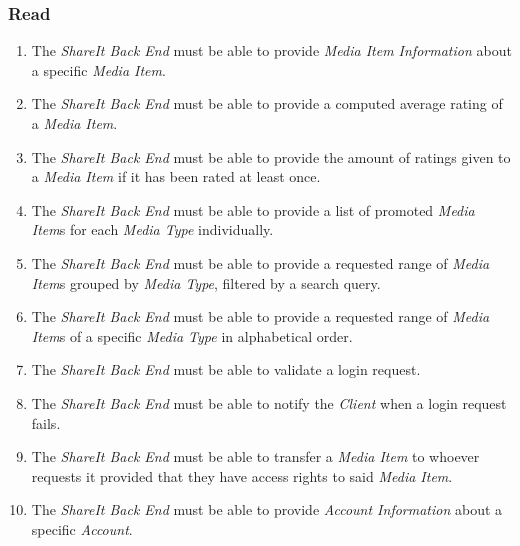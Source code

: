 

%

\noindent

\subsubsection{Read}
\begin{enumerate}[label=FR-\twodigits*, resume]

\item The \textit{ShareIt Back End} must be able to provide \textit{Media Item Information} about a specific \textit{Media Item}.

\item The \textit{ShareIt Back End} must be able to provide a computed average rating of a \textit{Media Item}.

\item The \textit{ShareIt Back End} must be able to provide the amount of ratings given to a \textit{Media Item} if it has been rated at least once.

\item The \textit{ShareIt Back End} must be able to provide a list of promoted \textit{Media Item}s for each \textit{Media Type} individually.

\item The \textit{ShareIt Back End} must be able to provide a requested range of \textit{Media Item}s grouped by \textit{Media Type}, filtered by a search query.

\item The \textit{ShareIt Back End} must be able to provide a requested range of \textit{Media Item}s of a specific \textit{Media Type} in alphabetical order.

\item The \textit{ShareIt Back End} must be able to validate a login request.

\item The \textit{ShareIt Back End} must be able to notify the \textit{Client} when a login request fails.

\item The \textit{ShareIt Back End} must be able to transfer a \textit{Media Item} to whoever requests it provided that they have access rights to said \textit{Media Item}.

\item The \textit{ShareIt Back End} must be able to provide \textit{Account Information} about a specific \textit{Account}.
\end{enumerate}

